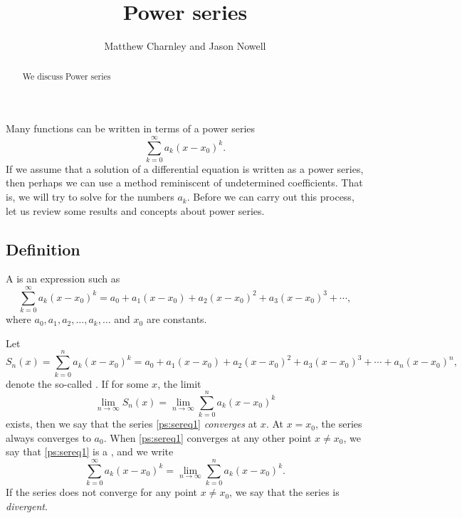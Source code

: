 \documentclass{ximera}
\title{Power series}
\author{Matthew Charnley and Jason Nowell}
\begin{document}
\begin{abstract}
    We discuss Power series
\end{abstract}
\maketitle


\label{powerseries:section}




Many functions can be written in terms of a power series
\begin{equation*}
    \sum_{k=0}^\infty a_k {(x-x_0)}^k .
\end{equation*}
If we assume that a solution of a differential equation is written as a power series, then perhaps we can use a method reminiscent of undetermined coefficients.  That is, we will try to solve for the numbers $a_k$. Before we can carry out this process, let us review some results and concepts about power series.

\subsection{Definition}

\begin{definition} 
    A \emph{} is an expression such as
    \begin{equation} \label{ps:sereq1}
        \sum_{k=0}^\infty a_k {(x-x_0)}^k = a_0 + a_1 (x-x_0) + a_2 {(x-x_0)}^2 + a_3 {(x-x_0)}^3 + \cdots,
    \end{equation}
    where $a_0,a_1,a_2,\ldots,a_k,\ldots$ and $x_0$ are constants.  
\end{definition} 
Let
\begin{equation*}
    S_n(x) = \sum_{k=0}^n a_k {(x-x_0)}^k = a_0 + a_1 (x-x_0) + a_2 {(x-x_0)}^2 + a_3 {(x-x_0)}^3 + \cdots + a_n {(x-x_0)}^n ,
\end{equation*}
denote the so-called \emph{}.  If for some $x$, the limit
\begin{equation*}
    \lim_{n\to \infty} S_n(x) = \lim_{n\to\infty} \sum_{k=0}^n a_k {(x-x_0)}^k
\end{equation*}
exists, then we say that the series \eqref{ps:sereq1} \emph{converges} at $x$. At $x=x_0$, the series always converges to $a_0$. When \eqref{ps:sereq1} converges at any other point $x \not= x_0$, we say that \eqref{ps:sereq1} is a \emph{}, and we write
\begin{equation*}
    \sum_{k=0}^\infty a_k {(x-x_0)}^k = \lim_{n\to\infty} \sum_{k=0}^n a_k {(x-x_0)}^k.
\end{equation*}
If the series does not converge for any point $x \not= x_0$, we say that the series is \emph{divergent}.
\end{document}
